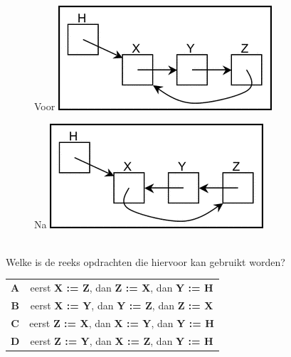 \documentclass[12pt, a4paper]{article}
\begin{document}
\begin{minipage}{\textwidth}
			\begin{minipage}{0.45\linewidth}
				\begin{figure}[H]
					\centering
					\large
					Voor
					\includegraphics[width=\linewidth]{image2} 
				\end{figure}
			\end{minipage} \hfill
			\begin{minipage}{0.45\linewidth}
				\begin{figure}[H]
					\centering
					\large
					Na
					\includegraphics[width=\linewidth]{image3} 
				\end{figure}
			\end{minipage} \\

		
			Welke is de reeks opdrachten die hiervoor kan gebruikt worden?
		
			\begin{table}[H]
				\centering
				\begin{tabular}{|c|c|}
					\hline
					\textbf{A} & eerst \textbf{X := Z}, dan \textbf{Z := X}, dan \textbf{Y := H} \\
					\textbf{B} & eerst \textbf{X := Y}, dan \textbf{Y := Z}, dan \textbf{Z := X} \\ 
					\textbf{C} & eerst \textbf{Z := X}, dan \textbf{X := Y}, dan \textbf{Y := H} \\ 
					\textbf{D} & eerst \textbf{Z := Y}, dan \textbf{X := Z}, dan \textbf{Y := H} \\
					\hline 
				\end{tabular}
			\end{table}
	\end{minipage} \\ \\
	
\end{document}
